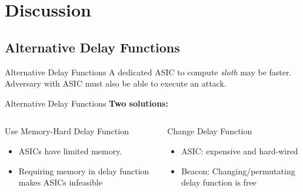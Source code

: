 \section{Discussion}


\subsection{Alternative Delay Functions}

\begin{frame}{Alternative Delay Functions}
    \centering
    A dedicated ASIC to compute \emph{sloth} may be faster.
    \\
    \vspace{1cm}
    Adversary with ASIC must also be able to execute an attack.
\end{frame}

\begin{frame}{Alternative Delay Functions}
    \textbf{Two solutions:}

    \vspace{.5cm}
    \centering
    \begin{columns}[T, onlytextwidth]
        \begin{block}{Use Memory-Hard Delay Function}
            \begin{itemize}
                \item ASICs have limited memory.
                \item Requiring memory in delay function makes ASICs infeasible
            \end{itemize}
        \end{block}

        \begin{block}{Change Delay Function}
            \begin{itemize}
                \item ASIC: expensive and hard-wired
                \item Beacon: Changing/permutating delay function is free
            \end{itemize}
        \end{block}
    \end{columns}
\end{frame}


